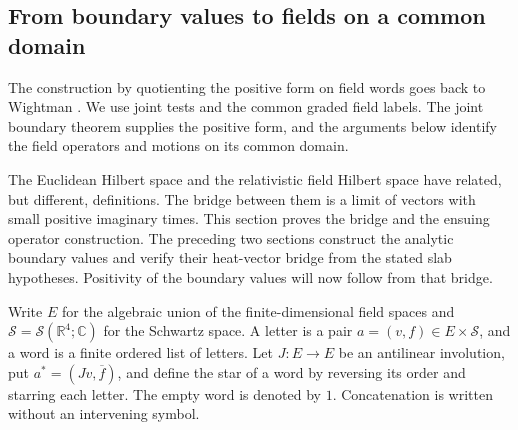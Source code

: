 \subsection{From boundary values to fields on a common domain}
\label{sec:word-reconstruction}

The construction by quotienting the positive form on field words
goes back to Wightman \cite[\S6]{Wightman56}. We use joint tests and the
common graded field labels. The joint boundary theorem supplies the
positive form, and the arguments below identify the field operators
and motions on its common domain.

The Euclidean Hilbert space and the relativistic field Hilbert space have
related, but different, definitions. The bridge between them is a limit of
vectors with small positive imaginary times. This section proves the bridge and
the ensuing operator construction. The preceding two sections construct the analytic boundary values and
verify their heat-vector bridge from the stated slab hypotheses. Positivity
of the boundary values will now follow from that bridge.

Write $E$ for the algebraic union of the finite-dimensional field spaces and
$\mathscr S=\mathscr S(\mathbb R^4;\mathbb C)$ for the Schwartz space. A letter is
a pair $a=(v,f)\in E\times\mathscr S$, and a word is a finite ordered list of
letters. Let $J:E\to E$ be an antilinear involution, put
$a^*=(Jv,\overline f)$, and define the star of a word by reversing its order
and starring each letter. The empty word is denoted by $1$. Concatenation is
written without an intervening symbol.

